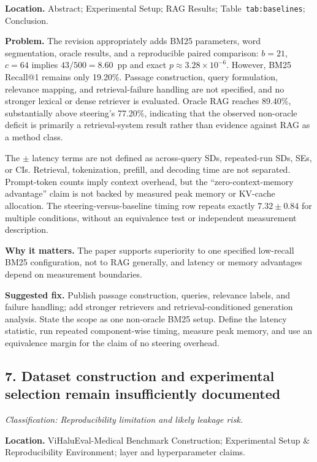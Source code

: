 \documentclass[11pt]{article}
\newcommand{\findinglabel}[1]{\textbf{#1}}
\newcommand{\classification}[1]{\textit{Classification: #1.}}
\begin{document}
\findinglabel{Location.} Abstract; Experimental Setup; RAG Results; Table~\texttt{tab:baselines}; Conclusion.

\findinglabel{Problem.} The revision appropriately adds BM25 parameters, word segmentation, oracle results, and a reproducible paired comparison: $b=21$, $c=64$ implies $43/500=8.60$~pp and exact $p\approx3.28\times10^{-6}$.  However, BM25 Recall@1 remains only 19.20\%.  Passage construction, query formulation, relevance mapping, and retrieval-failure handling are not specified, and no stronger lexical or dense retriever is evaluated.  Oracle RAG reaches 89.40\%, substantially above steering's 77.20\%, indicating that the observed non-oracle deficit is primarily a retrieval-system result rather than evidence against RAG as a method class.

The $\pm$ latency terms are not defined as across-query SDs, repeated-run SDs, SEs, or CIs.  Retrieval, tokenization, prefill, and decoding time are not separated.  Prompt-token counts imply context overhead, but the ``zero-context-memory advantage'' claim is not backed by measured peak memory or KV-cache allocation.  The steering-versus-baseline timing row repeats exactly $7.32\pm0.84$ for multiple conditions, without an equivalence test or independent measurement description.

\findinglabel{Why it matters.} The paper supports superiority to one specified low-recall BM25 configuration, not to RAG generally, and latency or memory advantages depend on measurement boundaries.

\findinglabel{Suggested fix.} Publish passage construction, queries, relevance labels, and failure handling; add stronger retrievers and retrieval-conditioned generation analysis.  State the scope as one non-oracle BM25 setup.  Define the latency statistic, run repeated component-wise timing, measure peak memory, and use an equivalence margin for the claim of no steering overhead.

\subsection*{7. Dataset construction and experimental selection remain insufficiently documented}

\classification{Reproducibility limitation and likely leakage risk}

\findinglabel{Location.} ViHaluEval-Medical Benchmark Construction; Experimental Setup \& Reproducibility Environment; layer and hyperparameter claims.
\end{document}
